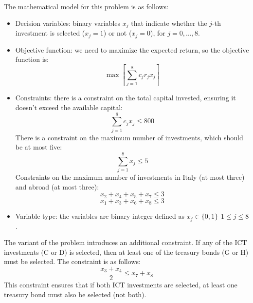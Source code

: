 \documentclass[12pt, a4paper]{report}
\begin{document}
\begin{example}
        The mathematical model for this problem is as follows:
        \begin{itemize}
            \item Decision variables: binary variables $x_j$ that indicate whether the $j$-th investment is selected ($x_j=1$) or not ($x_j=0$), for $j=0,\dots, 8$.          
            \item Objective function: we need to maximize the expected return, so the objective function is:
                \[\max{\left[\sum_{j=1}^8{c_jr_jx_j}\right]}\]
            \item Constraints: there is a constraint on the total capital invested, ensuring it doesn't exceed the available capital:
                \[\sum_{j=1}^8{c_jx_j} \leq 800\]
                There is a constraint on the maximum number of investments, which should be at most five:
                \[\sum_{j=1}^8{x_j} \leq 5\]
                Constraints on the maximum number of investments in Italy (at most three) and abroad (at most three):
                \[x_2+x_4+x_5+x_7 \leq 3\]
                \[x_1+x_3+x_6+x_8 \leq 3\]
            \item Variable type: the variables are binary integer defined as $x_j \in \{0,1\} \:\: 1 \leq j \leq 8$. 
        \end{itemize}
        The variant of the problem introduces an additional constraint. 
        If any of the ICT investments (C or D) is selected, then at least one of the treasury bonds (G or H) must be selected. 
        The constraint is as follows:
        \[\dfrac{x_3+x_4}{2} \leq x_7+x_8\]
        This constraint ensures that if both ICT investments are selected, at least one treasury bond must also be selected (not both).
    \end{example}
\end{document}
